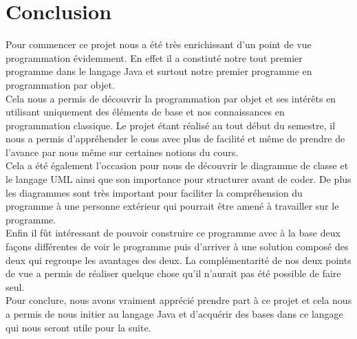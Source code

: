 \documentclass[12,french]{report}
\begin{document}
\chapter*{Conclusion}

Pour commencer ce projet nous a été très enrichissant d'un point de vue programmation évidemment. En effet il a constiuté notre tout premier programme dans le langage Java et surtout notre premier programme en programmation par objet.\\
Cela nous a permis de découvrir la programmation par objet et ses intérêts en utilisant uniquement des éléments de base et nos connaissances en programmation classique. Le projet étant réalisé au tout début du semestre, il nous a permis d'appréhender le cous avec plus de facilité et même de prendre de l'avance par nous même sur certaines notions du cours.\\
Cela a été également l'occasion pour nous de découvrir le diagramme de classe et le langage UML ainsi que son importance pour structurer avant de coder. De plus les diagrammes sont très important pour faciliter la compréhension du programme à une personne extérieur qui pourrait être amené à travailler sur le programme.\\

Enfin il fût intéressant de pouvoir construire ce programme avec à la base deux façons différentes de voir le programme puis d'arriver à une solution composé des deux qui regroupe les avantages des deux. La complémentarité de nos deux points de vue a permis de réaliser quelque chose qu'il n'aurait pas été possible de faire seul.\\

Pour conclure, nous avons vraiment apprécié prendre part à ce projet et cela nous a permis de nous initier au langage Java et d'acquérir des bases dans ce langage qui nous seront utile pour la suite.
\end{document}
